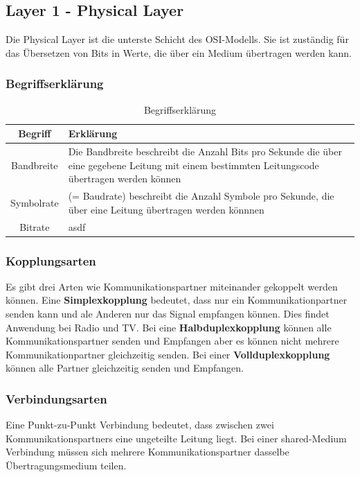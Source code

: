 \documentclass{article}
\begin{document}
\subsection{Layer 1 - Physical Layer}
Die Physical Layer ist die unterste Schicht des OSI-Modells. Sie ist zuständig für das Übersetzen von Bits in Werte, die über ein Medium übertragen werden kann.
\subsubsection{Begriffserklärung}
\begin{table}[h!]
		\begin{center}
				\caption{Begriffserklärung}
				\label{tab:Begriffserklärung}
				\begin{tabular}{|c|p{9cm}|}
						\hline
						\textbf{Begriff} & \textbf{Erklärung} \\
						\hline
						Bandbreite & Die Bandbreite beschreibt die Anzahl Bits pro Sekunde die über eine gegebene Leitung mit einem bestimmten Leitungscode übertragen werden können\\
						\hline
						Symbolrate & (= Baudrate) beschreibt die Anzahl Symbole pro Sekunde, die über eine Leitung übertragen werden könnnen\\
						\hline
						Bitrate & asdf\\
						\hline
				\end{tabular}
		\end{center}
\end{table}
\subsubsection{Kopplungsarten}
Es gibt drei Arten wie Kommunikationspartner miteinander gekoppelt werden können. Eine \textbf{Simplexkopplung} bedeutet, dass nur ein Kommunikationpartner senden kann und ale Anderen nur das Signal empfangen können. Dies findet Anwendung bei Radio und TV. Bei eine \textbf{Halbduplexkopplung} können alle Kommunikationspartner senden und Empfangen aber es können nicht mehrere Kommunikationpartner gleichzeitig senden. Bei einer \textbf{Vollduplexkopplung} können alle Partner gleichzeitig senden und Empfangen. 
\subsubsection{Verbindungsarten}
Eine Punkt-zu-Punkt Verbindung bedeutet, dass zwischen zwei Kommunikationspartners eine ungeteilte Leitung liegt. Bei einer shared-Medium Verbindung müssen sich mehrere Kommunikationspartner dasselbe Übertragungsmedium teilen.
\end{document}
